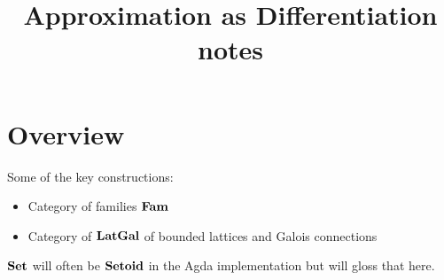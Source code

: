 \documentclass[acmsmall,nonacm]{acmart}
\begin{document}
\title{Approximation as Differentiation notes}
\maketitle

\section{Overview}

Some of the key constructions:
\begin{itemize}
\item Category of families $\mathbf{Fam}$
\item Category of $\mathbf{LatGal}$ of bounded lattices and Galois connections
\end{itemize}

\noindent $\mathbf{Set}$ will often be $\mathbf{Setoid}$ in the Agda implementation but will gloss that here.



\end{document}
